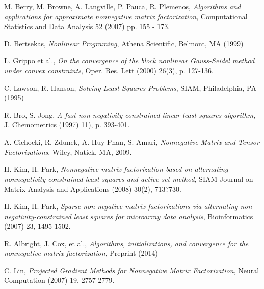 \documentclass[final,leqno,onefignum,onetabnum]{siamltex1213}
\begin{document}
\begin{thebibliography}{1}
 {\sc M. Berry, M. Browne, A. Langville, P. Pauca, R. Plemenos},
{\em Algorithms and applications for approximate nonnegative matrix factorization}, Computational Statistics and Data Analysis 52 (2007) pp. 155 - 173.

 {\sc D. Bertsekas},
{\em Nonlinear Programing}, Athena Scientific, Belmont, MA (1999)

 {\sc L. Grippo et al.},
{\em On the convergence of the block nonlinear Gauss-Seidel method under convex constraints}, Oper. Res. Lett (2000) 26(3), p. 127-136.

 {\sc C. Lawson, R. Hanson},
{\em Solving Least Squares Problems}, SIAM, Philadelphia, PA (1995)

 {\sc R. Bro, S. Jong},
{\em A fast non-negativity constrained linear least squares algorithm}, J. Chemometrics (1997) 11), p. 393-401.

 {\sc A. Cichocki, R. Zdunek, A. Huy Phan, S. Amari}, {\em Nonnegative Matrix and Tensor Factorizations}, Wiley, Natick, MA, 2009.

 {\sc H. Kim, H. Park}, {\em Nonnegative matrix factorization based on alternating nonnegativity constrained least squares and active set method}, SIAM Journal on Matrix Analysis and Applications (2008) 30(2), 713?730.

 {\sc H. Kim, H. Park}, {\em Sparse non-negative matrix factorizations via alternating non-negativity-constrained least squares for microarray data analysis}, Bioinformatics (2007) 23, 1495-1502. 

 {\sc R. Albright, J. Cox, et al.},
{\em Algorithms, initializations, and convergence for the nonnegative matrix factorization}, Preprint (2014)

 {\sc C. Lin},
{\em Projected Gradient Methods for Nonnegative Matrix Factorization}, Neural Computation (2007) 19, 2757-2779. 

\end{thebibliography}
\end{document}
